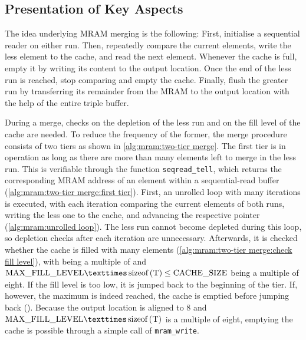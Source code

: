 \subsection{Presentation of Key Aspects}
\label{sec:mram:merge:presentation}

The idea underlying \ac{MRAM} merging is the following:
First, initialise a sequential reader on either run.
Then, repeatedly compare the current elements, write the less element to the cache, and read the next element.
Whenever the cache is full, empty it by writing its content to the output location.
Once the end of the less run is reached, stop comparing and empty the cache.
Finally, flush the greater run by transferring its remainder from the \ac{MRAM} to the output location with the help of the entire triple buffer.

During a merge, checks on the depletion of the less run and on the fill level of the cache are needed.
To reduce the frequency of the former, the merge procedure consists of two tiers as shown in \cref{alg:mram:two-tier merge}.
The first tier is in operation as long as there are more than \unrollfactor{} many elements left to merge in the less run.
This is verifiable through the function \lstinline|seqread_tell|, which returns the corresponding \ac{MRAM} address of an element within a sequential-read buffer (\cref{alg:mram:two-tier merge:first tier}).
First, an unrolled loop with \unrollfactor{} many iterations is executed, with each iteration comparing the current elements of both runs, writing the less one to the cache, and advancing the respective pointer (\cref{alg:mram:unrolled loop}).
The less run cannot become depleted during this loop, so depletion checks after each iteration are unnecessary.
Afterwards, it is checked whether the cache is filled with \unrolledcachelength{} many elements (\cref{alg:mram:two-tier merge:check fill level}), with \unrolledcachelength{} being a multiple of \unrollfactor{} and \(\unrolledcachelength{} × \text{\lstinline[keywords={}]|sizeof(T)|} \le \cachesize{}\) being a multiple of eight.
If the fill level is too low, it is jumped back to the beginning of the tier.
If, however, the maximum is indeed reached, the cache is emptied before jumping back ().
Because the output location is aligned to \qty{8}{\byte} and \(\unrolledcachelength{} × \text{\lstinline[keywords={}]|sizeof(T)|}\) is a multiple of eight, emptying the cache is possible through a simple call of \lstinline|mram_write|.


